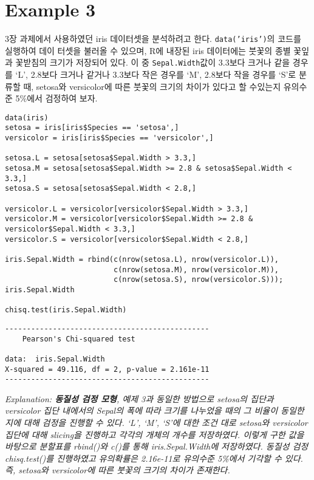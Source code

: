 \documentclass{article}
\begin{document}
\section*{Example 3}
3장 과제에서 사용하였던 iris 데이터셋을 분석하려고 한다. \texttt{data('iris')}의 코드를 실행하여 데이
터셋을 불러올 수 있으며, R에 내장된 iris 데이터에는 붓꽃의 종별 꽃잎과 꽃받침의 크기가 저장되어 있다. 이 중 \texttt{Sepal.Width}값이 3.3보다 크거나 같을 경우를 `L', 2.8보다 크거나 같거나
3.3보다 작은 경우를 `M', 2.8보다 작을 경우를 `S'로 분류할 때, setosa와 versicolor에 따른
붓꽃의 크기의 차이가 있다고 할 수있는지 유의수준 5\%에서 검정하여 보자. 
\begin{lstlisting}[style={r-style}]
data(iris)
setosa = iris[iris$Species == 'setosa',]
versicolor = iris[iris$Species == 'versicolor',]

setosa.L = setosa[setosa$Sepal.Width > 3.3,]
setosa.M = setosa[setosa$Sepal.Width >= 2.8 & setosa$Sepal.Width < 3.3,]
setosa.S = setosa[setosa$Sepal.Width < 2.8,]

versicolor.L = versicolor[versicolor$Sepal.Width > 3.3,]
versicolor.M = versicolor[versicolor$Sepal.Width >= 2.8 & versicolor$Sepal.Width < 3.3,]
versicolor.S = versicolor[versicolor$Sepal.Width < 2.8,]

iris.Sepal.Width = rbind(c(nrow(setosa.L), nrow(versicolor.L)),
                         c(nrow(setosa.M), nrow(versicolor.M)),
                         c(nrow(setosa.S), nrow(versicolor.S))); iris.Sepal.Width

chisq.test(iris.Sepal.Width)
\end{lstlisting}
\begin{lstlisting}[style={out-style}]
-----------------------------------------------
	Pearson's Chi-squared test

data:  iris.Sepal.Width
X-squared = 49.116, df = 2, p-value = 2.161e-11
-----------------------------------------------
\end{lstlisting}
\emph{Explanation: \textbf{동질성 검정 모형}, 예제 3과 동일한 방법으로 setosa의 집단과 versicolor 집단 내에서의 Sepal의 폭에 따라 크기를 나누었을 때의 그 비율이 동일한지에 대해 검정을 진행할 수 있다. `L', `M', `S'에 대한 조건 대로 setosa와 versicolor 집단에 대해 slicing을 진행하고 각각의 개체의 개수를 저장하였다. 이렇게 구한 값을 바탕으로 분할표를 rbind()와 c()를 통해 iris.Sepal.Width에 저장하였다. 동질성 검정 chisq.test()를 진행하였고 유의확률은 2.16e-11로 유의수준 5\%에서 기각할 수 있다. 즉, setosa와 versicolor에 따른 붓꽃의 크기의 차이가 존재한다. } \\
\end{document}
